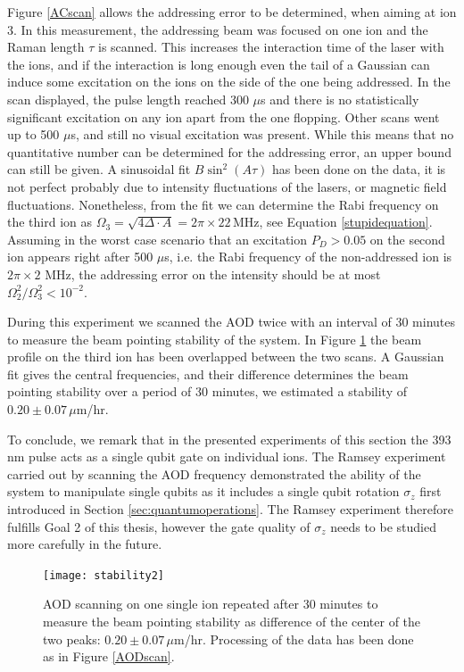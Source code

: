 Figure \ref{ACscan} allows the addressing error to be determined, when aiming at ion 3. In this measurement, the addressing beam was focused on one ion and the Raman length $\tau$ is scanned. This increases the interaction time of the laser with the ions, and if the interaction is long enough even the tail of a Gaussian can induce some excitation on the ions on the side of the one being addressed. In the scan displayed, the pulse length reached 300 $\mu$s and there is no statistically significant excitation on any ion apart from the one flopping. Other scans went up to 500 $\mu$s, and still no visual excitation was present. While this means that no quantitative number can be determined for the addressing error, an upper bound can still be given. A sinusoidal fit $B\sin^2(A\tau)$ has been done on the data, it is not perfect probably due to intensity fluctuations of the lasers, or magnetic field fluctuations. Nonetheless, from the fit we can determine the Rabi frequency on the third ion as $\Omega_3 = \sqrt{4\Delta \cdot A} = 2\pi\times22\,\text{MHz}$, see Equation \eqref{stupidequation}. Assuming in the worst case scenario that an excitation $P_D>0.05$ on the second ion appears right after 500 $\mu$s, i.e. the Rabi frequency of the non-addressed ion is $2\pi\times2$ MHz, the addressing error on the intensity should be at most $\Omega_2^2/\Omega_3^2< 10^{-2}$.\par
During this experiment we scanned the AOD twice with an interval of 30 minutes to measure the beam pointing stability of the system. In Figure \ref{fig:stability} the beam profile on the third ion has been overlapped between the two scans. A Gaussian fit gives the central frequencies, and their difference determines the beam pointing stability over a period of 30 minutes, we estimated a stability of $0.20\pm 0.07\,\mu$m/hr.\par
To conclude, we remark that in the presented experiments of this section the 393 nm pulse acts as a single qubit gate on individual ions. The Ramsey experiment carried out by scanning the AOD frequency demonstrated the ability of the system to manipulate single qubits as it includes a single qubit rotation $\sigma_z$ first introduced in Section \ref{sec:quantumoperations}. The Ramsey experiment therefore fulfills Goal 2 of this thesis, however the gate quality of $\sigma_z$ needs to be studied more carefully in the future.
\begin{figure}
\centering
\texttt{[image: stability2]}
\caption{AOD scanning on one single ion repeated after 30 minutes to measure the beam pointing stability as difference of the center of the two peaks: $0.20\pm 0.07\,\mu$m/hr. Processing of the data has been done as in Figure \ref{AODscan}.}
\label{fig:stability}
\end{figure}
